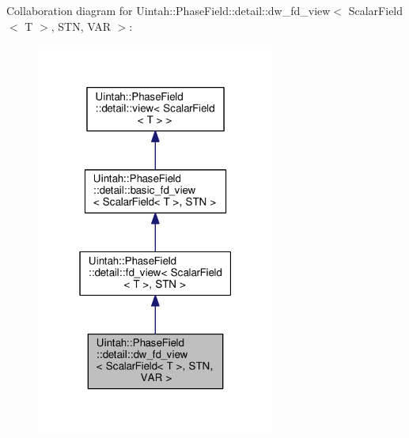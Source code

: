 Collaboration diagram for Uintah\+:\+:Phase\+Field\+:\+:detail\+:\+:dw\+\_\+fd\+\_\+view$<$ Scalar\+Field$<$ T $>$, S\+TN, V\+AR $>$\+:\nopagebreak
\begin{figure}[H]
\begin{center}
\leavevmode
\includegraphics[width=223pt]{classUintah_1_1PhaseField_1_1detail_1_1dw__fd__view_3_01ScalarField_3_01T_01_4_00_01STN_00_01VAR_01_4__coll__graph}
\end{center}
\end{figure}
